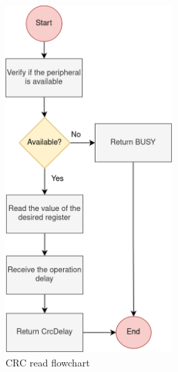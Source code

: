 \begin{figure}[t!]
	\centering
	\begin{subfigure}{0.4\textwidth}
		\includegraphics[width=0.7\textwidth]{Images/CrcReadFunction.png}
 		\caption[1\textwidth]{CRC read flowchart} 
	 	\label{fig_CrcReadFunction}
	\end{subfigure}
	\hspace{1cm}
	\begin{subfigure}{0.4\textwidth}
		\centering

\end{subfigure}
\end{figure}
